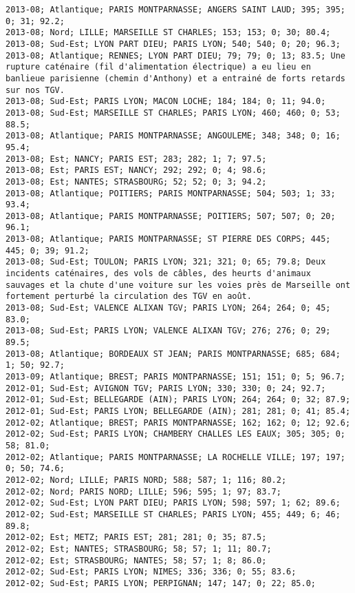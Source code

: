 \documentclass{article}
\begin{document}
\begin{Verbatim}[commandchars=\\\{\}]
2013-08; Atlantique; PARIS MONTPARNASSE; ANGERS SAINT LAUD; 395; 395; 0; 31; 92.2; 
2013-08; Nord; LILLE; MARSEILLE ST CHARLES; 153; 153; 0; 30; 80.4; 
2013-08; Sud-Est; LYON PART DIEU; PARIS LYON; 540; 540; 0; 20; 96.3; 
2013-08; Atlantique; RENNES; LYON PART DIEU; 79; 79; 0; 13; 83.5; Une rupture caténaire (fil d'alimentation électrique) a eu lieu en banlieue parisienne (chemin d'Anthony) et a entrainé de forts retards sur nos TGV.
2013-08; Sud-Est; PARIS LYON; MACON LOCHE; 184; 184; 0; 11; 94.0; 
2013-08; Sud-Est; MARSEILLE ST CHARLES; PARIS LYON; 460; 460; 0; 53; 88.5; 
2013-08; Atlantique; PARIS MONTPARNASSE; ANGOULEME; 348; 348; 0; 16; 95.4; 
2013-08; Est; NANCY; PARIS EST; 283; 282; 1; 7; 97.5; 
2013-08; Est; PARIS EST; NANCY; 292; 292; 0; 4; 98.6; 
2013-08; Est; NANTES; STRASBOURG; 52; 52; 0; 3; 94.2; 
2013-08; Atlantique; POITIERS; PARIS MONTPARNASSE; 504; 503; 1; 33; 93.4; 
2013-08; Atlantique; PARIS MONTPARNASSE; POITIERS; 507; 507; 0; 20; 96.1; 
2013-08; Atlantique; PARIS MONTPARNASSE; ST PIERRE DES CORPS; 445; 445; 0; 39; 91.2; 
2013-08; Sud-Est; TOULON; PARIS LYON; 321; 321; 0; 65; 79.8; Deux incidents caténaires, des vols de câbles, des heurts d'animaux sauvages et la chute d'une voiture sur les voies près de Marseille ont fortement perturbé la circulation des TGV en août.
2013-08; Sud-Est; VALENCE ALIXAN TGV; PARIS LYON; 264; 264; 0; 45; 83.0; 
2013-08; Sud-Est; PARIS LYON; VALENCE ALIXAN TGV; 276; 276; 0; 29; 89.5; 
2013-08; Atlantique; BORDEAUX ST JEAN; PARIS MONTPARNASSE; 685; 684; 1; 50; 92.7; 
2013-09; Atlantique; BREST; PARIS MONTPARNASSE; 151; 151; 0; 5; 96.7; 
2012-01; Sud-Est; AVIGNON TGV; PARIS LYON; 330; 330; 0; 24; 92.7; 
2012-01; Sud-Est; BELLEGARDE (AIN); PARIS LYON; 264; 264; 0; 32; 87.9; 
2012-01; Sud-Est; PARIS LYON; BELLEGARDE (AIN); 281; 281; 0; 41; 85.4; 
2012-02; Atlantique; BREST; PARIS MONTPARNASSE; 162; 162; 0; 12; 92.6; 
2012-02; Sud-Est; PARIS LYON; CHAMBERY CHALLES LES EAUX; 305; 305; 0; 58; 81.0; 
2012-02; Atlantique; PARIS MONTPARNASSE; LA ROCHELLE VILLE; 197; 197; 0; 50; 74.6; 
2012-02; Nord; LILLE; PARIS NORD; 588; 587; 1; 116; 80.2; 
2012-02; Nord; PARIS NORD; LILLE; 596; 595; 1; 97; 83.7; 
2012-02; Sud-Est; LYON PART DIEU; PARIS LYON; 598; 597; 1; 62; 89.6; 
2012-02; Sud-Est; MARSEILLE ST CHARLES; PARIS LYON; 455; 449; 6; 46; 89.8; 
2012-02; Est; METZ; PARIS EST; 281; 281; 0; 35; 87.5; 
2012-02; Est; NANTES; STRASBOURG; 58; 57; 1; 11; 80.7; 
2012-02; Est; STRASBOURG; NANTES; 58; 57; 1; 8; 86.0; 
2012-02; Sud-Est; PARIS LYON; NIMES; 336; 336; 0; 55; 83.6; 
2012-02; Sud-Est; PARIS LYON; PERPIGNAN; 147; 147; 0; 22; 85.0; 

\end{Verbatim}
\end{document}
